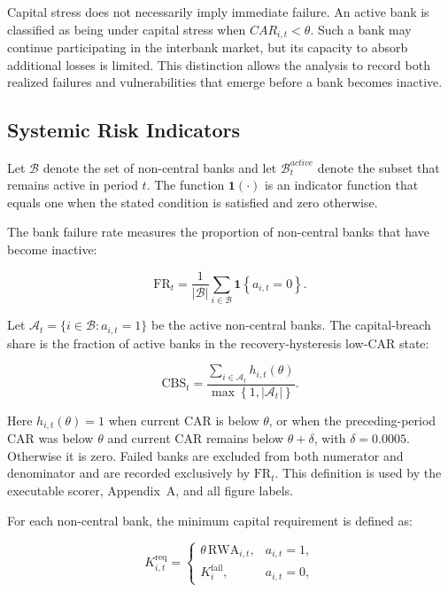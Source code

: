 Capital stress does not necessarily imply immediate failure. An active
bank is classified as being under capital stress when
\({CAR}_{i,t} < \theta\). Such a bank may continue participating in the
interbank market, but its capacity to absorb additional losses is
limited. This distinction allows the analysis to record both realized
failures and vulnerabilities that emerge before a bank becomes inactive.

\subsection{Systemic Risk Indicators}

Let \(\mathcal{B}\) denote the set of non-central banks and let
\(\mathcal{B}_{t}^{active}\) denote the subset that remains active in
period \(t\). The function \(\mathbf{1}( \cdot )\) is an indicator
function that equals one when the stated condition is satisfied and zero
otherwise.

The bank failure rate measures the proportion of non-central banks that
have become inactive:


\begin{equation}
\mathrm{FR}_t=\frac{1}{\lvert\mathcal B\rvert}\sum_{i\in\mathcal B}\mathbf{1}\left\{a_{i,t}=0\right\}\label{eq:failure-rate}.
\end{equation}


Let \(\mathcal A_t=\{i\in\mathcal B:a_{i,t}=1\}\) be the active
non-central banks. The capital-breach share is the fraction of active
banks in the recovery-hysteresis low-CAR state:


\begin{equation}
\mathrm{CBS}_t=
\frac{\displaystyle\sum_{i\in\mathcal A_t}h_{i,t}(\theta)}
{\max\left\{1,\lvert\mathcal A_t\rvert\right\}}
\label{eq:capital-stress-share}.
\end{equation}

Here \(h_{i,t}(\theta)=1\) when current CAR is below \(\theta\), or when
the preceding-period CAR was below \(\theta\) and current CAR remains
below \(\theta+\delta\), with \(\delta=0.0005\). Otherwise it is zero.
Failed banks are excluded from both numerator and denominator and are
recorded exclusively by \(\mathrm{FR}_t\). This definition is used by the
executable scorer, Appendix~A, and all figure labels.

For each non-central bank, the minimum capital requirement is defined
as:


\begin{equation}
K_{i,t}^{\mathrm{req}}=\begin{cases}
 \theta\,\mathrm{RWA}_{i,t},&a_{i,t}=1,\\
 K_i^{\mathrm{fail}},&a_{i,t}=0,
 \end{cases}\label{eq:required-capital}
\end{equation}


